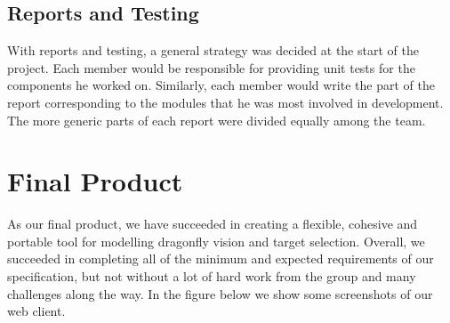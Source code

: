 \documentclass[a4paper,11pt]{article}
\begin{document}
\subsection{Reports and Testing}
With reports and testing, a general strategy was decided at the start of the project. Each member would be responsible for providing unit tests for the components he worked on. Similarly, each member would write the part of the report corresponding to the modules that he was most involved in development. The more generic parts of each report were divided equally among the team.


\clearpage
\section{Final Product}

As our final product, we have succeeded in creating a flexible, cohesive and portable tool for modelling dragonfly vision and target selection. Overall, we succeeded in completing all of the minimum and expected requirements of our specification, but not without a lot of hard work from the group and many challenges along the way. In the figure below we show some screenshots of our web client.
\end{document}
